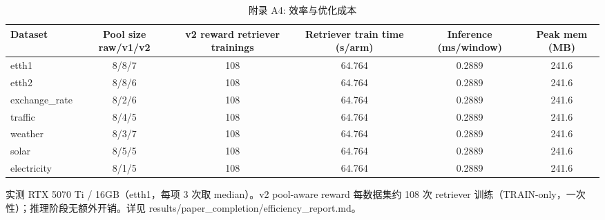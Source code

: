 \begin{table}[htbp]
  \centering
  \caption{附录 A4: 效率与优化成本}
  \label{tab:appendix_efficiency}
  \begin{tabular}{lccccc}
    \toprule
    Dataset & Pool size raw/v1/v2 & v2 reward retriever trainings & Retriever train time (s/arm) & Inference (ms/window) & Peak mem (MB) \\
    \midrule
    etth1 & 8/8/7 & 108 & 64.764 & 0.2889 & 241.6 \\
    etth2 & 8/8/6 & 108 & 64.764 & 0.2889 & 241.6 \\
    exchange\_rate & 8/2/6 & 108 & 64.764 & 0.2889 & 241.6 \\
    traffic & 8/4/5 & 108 & 64.764 & 0.2889 & 241.6 \\
    weather & 8/3/7 & 108 & 64.764 & 0.2889 & 241.6 \\
    solar & 8/5/5 & 108 & 64.764 & 0.2889 & 241.6 \\
    electricity & 8/1/5 & 108 & 64.764 & 0.2889 & 241.6 \\
    \bottomrule
  \end{tabular}
  {\footnotesize 实测 RTX 5070 Ti / 16GB（etth1，每项 3 次取 median）。v2 pool-aware reward 每数据集约 108 次 retriever 训练（TRAIN-only，一次性）；推理阶段无额外开销。详见 results/paper\_completion/efficiency\_report.md。}
\end{table}
